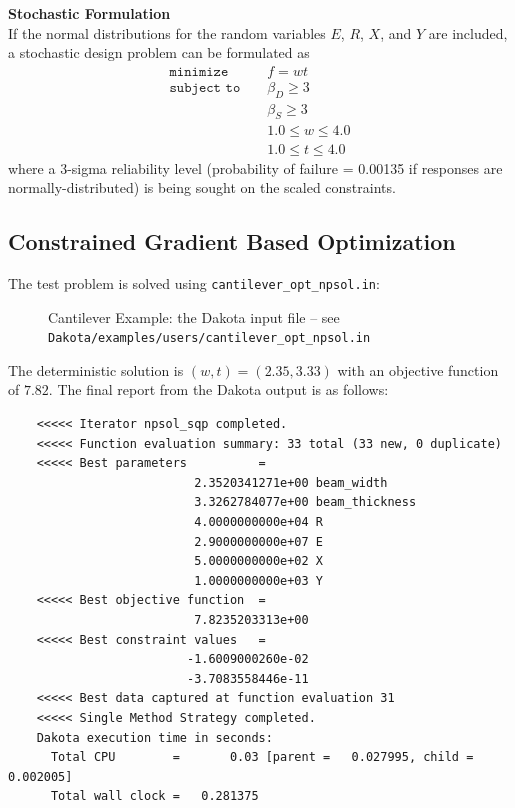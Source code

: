 {\bf Stochastic Formulation } \\
If the normal distributions for the random variables $E$, $R$, $X$,
and $Y$ are included, a stochastic design problem can be formulated as
\begin{eqnarray}
\texttt{minimize }   & & f = w t            \nonumber\\
\texttt{subject to } & & \beta_{D} \geq 3   \label{additional:cantouu}\\
                     & & \beta_{S} \geq 3   \nonumber\\
                     & & 1.0 \leq w \leq 4.0\nonumber\\
                     & & 1.0 \leq t \leq 4.0\nonumber
\end{eqnarray}
where a 3-sigma reliability level (probability of failure = 0.00135 if
responses are normally-distributed) is being sought on the scaled
constraints.

\subsection{Constrained Gradient Based Optimization}
The test problem is solved using {\tt cantilever\_opt\_npsol.in}:
\begin{figure}[ht!]
  \centering
  \begin{small}
    \begin{bigbox}
    \end{bigbox}
  \end{small}
  \caption{Cantilever Example: the Dakota input file --
see \texttt{Dakota/examples/users/cantilever\_opt\_npsol.in} }
  \label{additional:cant_opt_npsol}
\end{figure}

The deterministic solution is $(w,t)=(2.35,3.33)$ with an objective
function of $7.82$. The final report from the Dakota output is as
follows:
\begin{small}
\begin{verbatim}
    <<<<< Iterator npsol_sqp completed.
    <<<<< Function evaluation summary: 33 total (33 new, 0 duplicate)
    <<<<< Best parameters          =
                          2.3520341271e+00 beam_width
                          3.3262784077e+00 beam_thickness
                          4.0000000000e+04 R
                          2.9000000000e+07 E
                          5.0000000000e+02 X
                          1.0000000000e+03 Y
    <<<<< Best objective function  =
                          7.8235203313e+00
    <<<<< Best constraint values   =
                         -1.6009000260e-02
                         -3.7083558446e-11
    <<<<< Best data captured at function evaluation 31
    <<<<< Single Method Strategy completed.
    Dakota execution time in seconds:
      Total CPU        =       0.03 [parent =   0.027995, child =   0.002005]
      Total wall clock =   0.281375
\end{verbatim}
\end{small}

